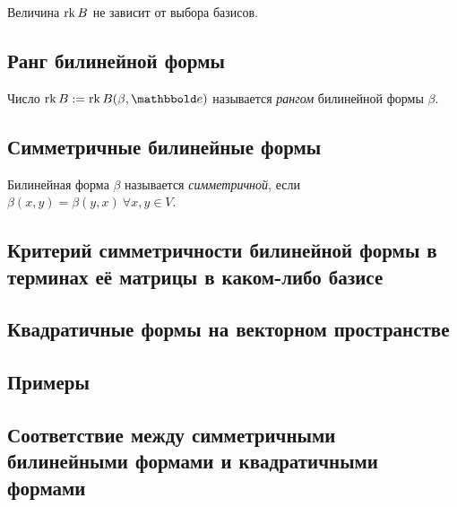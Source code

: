 \begin{corollary}
    Величина $\operatorname{\mathop{\mathrm{rk}}} B$ не зависит от выбора базисов. 
\end{corollary}


\subsection{Ранг билинейной формы}

\begin{definition}
    Число $\rk B := \rk B(\beta, \E)$ называется \textit{рангом} билинейной формы $\beta$.
\end{definition}


\subsection{Симметричные билинейные формы}

\begin{definition}
    Билинейная форма $\beta$ называется \textit{симметричной}, если $\beta(x, y) = \beta(y, x) \ \forall x, y \in V$.
\end{definition}

\subsection{Критерий симметричности билинейной формы в терминах её матрицы в каком-либо базисе}
\subsection{Квадратичные формы на векторном пространстве}
\subsection{Примеры}
\subsection{Соответствие между симметричными билинейными формами и квадратичными формами}

